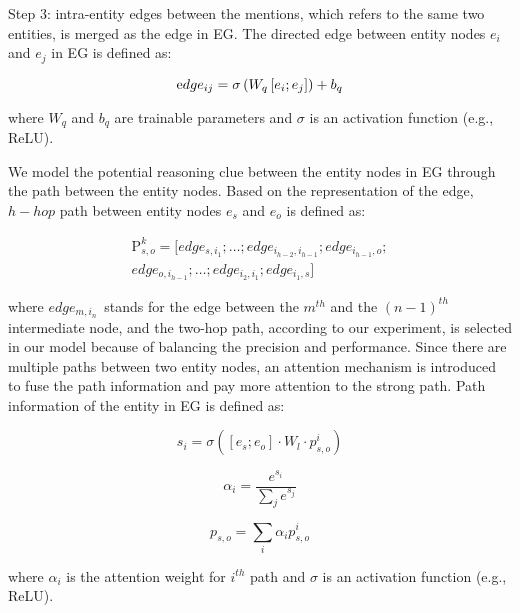 \documentclass{article}
\begin{document}
Step 3: intra-entity edges between the mentions, which refers to the same two entities, is merged as the edge in EG. The directed edge between entity nodes $e_{i}$ and $e_{j}$ in EG is defined as:

\begin{equation}
\text edge_{ij}=\sigma\left(W_{q}\left[e_{i} ; e_{j}\right]\right)+b_{q}
\label{eql8}
\end{equation}

where $W_{q}$ and $b_{q}$ are trainable parameters and $\sigma$ is an activation function (e.g., ReLU).

We model the potential reasoning clue between the entity nodes in EG through the path between the entity nodes. Based on the representation of the edge, $h-hop$ path between entity nodes $e_{s}$ and $e_{o}$ is defined as: 

\begin{equation}
\begin{gathered}
\mathrm{P}_{s, o}^{k}=[edge_{s, i_{1}} ; \ldots ;edge_{i_{h-2}, i_{h-1}} ;edge_{i_{h-1}, o} ; \\
 edge_{o, i_{h-1}} ; \ldots ; edge_{i_{2}, i_{1}} ; edge_{i_{1}, s} ]
\end{gathered}
\label{eql9}
\end{equation}

where $edge_{m,i_{n}~}$ stands for the edge between the $m^{th}$ and the $(n-1)^{th}$ intermediate node, and the two-hop path, according to our experiment, is selected in our model because of balancing the precision and performance. Since there are multiple paths between two entity nodes, an attention mechanism is introduced to fuse the path information and pay more attention to the strong path. Path information of the entity in EG is defined as:

\begin{equation}
s_{i}=\sigma\left(\left[e_{s} ; e_{o}\right] \cdot W_{l} \cdot p_{s, o}^{i}\right)
\label{eql10}
\end{equation}

\begin{equation}
\alpha_{i}=\frac{e^{s_{i}}}{\sum_{j} e^{s_{j}}}
\label{eql11}
\end{equation}

\begin{equation}
p_{s, o}=\sum_{i} \alpha_{i} p_{s, o}^{i}
\label{eql12}
\end{equation}

where $\alpha_{i}$ is the attention weight for $i^{th}$ path and $\sigma$ is an activation function (e.g., ReLU). 
\end{document}
